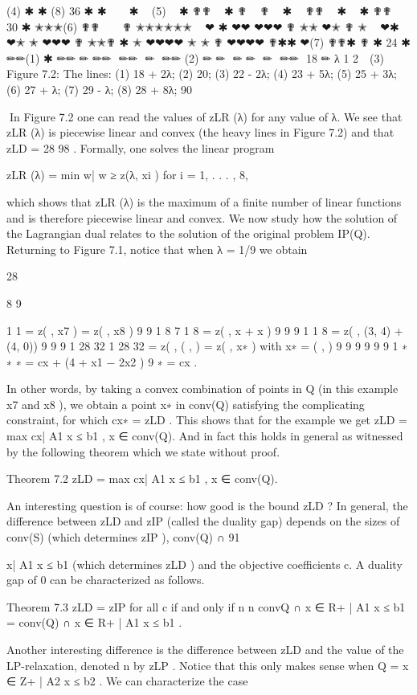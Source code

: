(4)
✱
✱
(8)
36
✱
✱
 
 
✱
 
(5)
 
✱
✟✟
 
✱
✟
 
✟
 
✱
 
✟✟
 
✱
 
✱ ✟✟
 
 
30
✱
✭✭✭(6)
✟✟
 
 
✟ ✭✭✭✭✭✭
 
❤
✱
❤❤
❤❤❤
✟
✭✭
❤✭
✟
✭
 
❤✱
❤✭
✭
❤❤❤
✟
✭✭✟
✱
✭
❤❤❤❤
✭
✭
✟
❤❤❤❤
✟✱✱
❤(7)
✟✟✱
✟
✱
24 ✱
✏✏(1)
✱
✏✏
✏
✏✏

✏✏

✏

✏✏
(2)
✏
✏

✏
✏

✏

✏✏

18 ✏
λ
1
2 
 (3)

Figure 7.2: The lines: (1) 18 + 2λ; (2) 20; (3) 22 - 2λ; (4) 23 + 5λ; (5) 25 + 3λ; (6) 27 + λ; (7) 29 - λ;
(8) 28 + 8λ;
90

In Figure 7.2 one can read the values of zLR (λ) for any value of λ. We see that zLR (λ) is piecewise linear
and convex (the heavy lines in Figure 7.2) and that zLD = 28 98 . Formally, one solves the linear program

zLR (λ) = min {w| w ≥ z(λ, xi ) for i = 1, . . . , 8},

which shows that zLR (λ) is the maximum of a finite number of linear functions and is therefore piecewise
linear and convex.
We now study how the solution of the Lagrangian dual relates to the solution of the original problem
IP(Q). Returning to Figure 7.1, notice that when λ = 1/9 we obtain

28

8
9

1
1
= z( , x7 ) = z( , x8 )
9
9
1 8 7 1 8
= z( , x + x )
9 9
9
1
1 8
= z( , (3, 4) + (4, 0))
9 9
9
1 28 32
1
28 32
= z( , ( , ) = z( , x∗ ) with x∗ = ( , )
9 9 9
9
9 9
1
∗
∗
∗
= cx + (4 + x1 − 2x2 )
9
∗
= cx .

In other words, by taking a convex combination of points in Q (in this example x7 and x8 ), we obtain a
point x∗ in conv(Q) satisfying the complicating constraint, for which cx∗ = zLD . This shows that for the
example we get zLD = max {cx| A1 x ≤ b1 , x ∈ conv(Q)}. And in fact this holds in general as witnessed
by the following theorem which we state without proof.

Theorem 7.2
zLD = max {cx| A1 x ≤ b1 , x ∈ conv(Q)}.

An interesting question is of course: how good is the bound zLD ? In general, the difference between
zLD and zIP (called the duality gap) depends on the sizes of conv(S) (which determines zIP ), conv(Q) ∩
91

{x| A1 x ≤ b1 } (which determines zLD ) and the objective coefficients c. A duality gap of 0 can be
characterized as follows.

Theorem 7.3 zLD = zIP for all c if and only if
n
n
conv{Q ∩ {x ∈ R+
| A1 x ≤ b1 }} = conv(Q) ∩ {x ∈ R+
| A1 x ≤ b1 }.

Another interesting difference is the difference between zLD and the value of the LP-relaxation, denoted
n
by zLP . Notice that this only makes sense when Q = {x ∈ Z+
| A2 x ≤ b2 }. We can characterize the case

